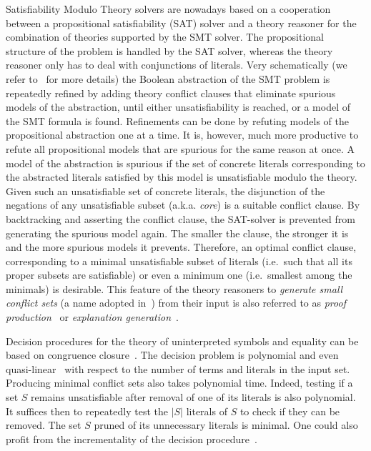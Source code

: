 \documentclass[smallextended]{svjour3}
\begin{document}
Satisfiability Modulo Theory solvers are nowadays based on a cooperation between a
propositional satisfiability (SAT) solver and a theory reasoner for the
combination of theories supported by the SMT solver. The propositional
structure of the problem is handled by the SAT solver, whereas the theory
reasoner only has to deal with conjunctions of literals.  Very schematically (we
refer to~\cite{Barrett14} for more details) the Boolean abstraction of the SMT
problem is repeatedly refined by adding theory conflict clauses that eliminate
spurious models of the abstraction, until either unsatisfiability is reached, or
a model of the SMT formula is found.  Refinements can be done by refuting models
of the propositional abstraction one at a time.  It is, however, much more
productive to refute all propositional models that are spurious for the same
reason at once.  A model of the abstraction is spurious if the set of concrete literals
corresponding to the abstracted literals satisfied by this model is
unsatisfiable modulo the theory.  Given such an unsatisfiable set of concrete literals, the
disjunction of the negations of any unsatisfiable subset (a.k.a. \emph{core}) is a suitable
conflict clause.  By backtracking and asserting the conflict clause, the
SAT-solver is prevented from generating the spurious model again. The smaller
the clause, the stronger it is and the more spurious models it prevents.
Therefore, an optimal conflict clause, corresponding to a minimal unsatisfiable
subset of literals (i.e.\ such that all its proper subsets are satisfiable) or
even a minimum one (i.e.\ smallest among the minimals) is desirable.  This
feature of the theory reasoners to \emph{generate small conflict sets} (a name
adopted in~\cite{Barrett14}) from their input is also referred to as \emph{proof
production}~\cite{Nieuwenhuis3,Nieuwenhuis9} or \emph{explanation
generation}~\cite{Nieuwenhuis6}.

Decision procedures for the theory of uninterpreted symbols and equality can be
based on congruence closure~\cite{Nelson2,Downey1,Nieuwenhuis6}.  The decision problem is polynomial
and even quasi-linear~\cite{Downey1} with respect to the number of terms and
literals in the input set.  Producing minimal conflict sets also takes
polynomial time.  Indeed, testing if a set $S$ remains unsatisfiable after
removal of one of its literals is also polynomial.  It suffices then to
repeatedly test the $|S|$ literals of $S$ to check if they can be removed.  The
set $S$ pruned of its unnecessary literals is minimal.  One could also profit from 
the incrementality of the decision procedure~\cite{Fontaine1}.
\end{document}
